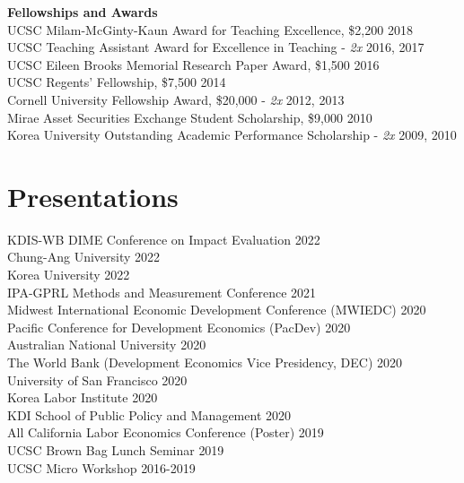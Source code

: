 \documentclass[letterpaper, margin, 10pt]{res} %
\begin{document}
\begin{resume}
{\bf Fellowships and Awards}\\
UCSC Milam-McGinty-Kaun Award for Teaching Excellence, \$2,200  \hfill{2018}\\
UCSC Teaching Assistant Award for Excellence in Teaching -  \textit{2x}   \hfill{2016, 2017}\\
UCSC Eileen Brooks Memorial Research Paper Award, \$1,500  \hfill{2016}\\
UCSC Regents' Fellowship, \$7,500 \hfill{2014}\\
Cornell University Fellowship Award, \$20,000 -  \textit{2x} \hfill{2012, 2013}\\
Mirae Asset Securities Exchange Student Scholarship, \$9,000 \hfill{2010}\\
Korea University Outstanding Academic Performance Scholarship -  \textit{2x} \hfill{2009, 2010}


\section{Presentations}
KDIS-WB DIME Conference on Impact Evaluation  \hfill{2022}\\
Chung-Ang University  \hfill{2022}\\
Korea University  \hfill{2022}\\
IPA-GPRL Methods and Measurement Conference  \hfill{2021}\\
Midwest International Economic Development Conference (MWIEDC)  \hfill{2020}\\
Pacific Conference for Development Economics (PacDev) \hfill{2020}\\
Australian National University \hfill{2020}\\
The World Bank (Development Economics Vice Presidency, DEC) \hfill{2020}\\
University of San Francisco \hfill{2020}\\
Korea Labor Institute \hfill{2020}\\
KDI School of Public Policy and Management \hfill{2020}\\
All California Labor Economics Conference (Poster)   \hfill{2019}\\
UCSC Brown Bag Lunch Seminar  \hfill{2019}\\
UCSC Micro Workshop \hfill{2016-2019}



\end{resume}
\end{document}
